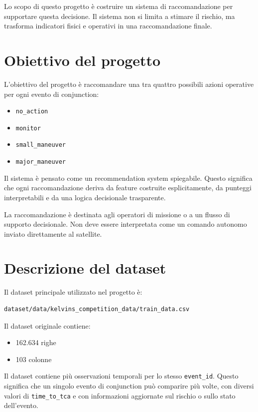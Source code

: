 \documentclass[12pt,a4paper]{article}
\begin{document}
Lo scopo di questo progetto è costruire un sistema di raccomandazione per supportare questa decisione. Il sistema non si limita a stimare il rischio, ma trasforma indicatori fisici e operativi in una raccomandazione finale.

\section{Obiettivo del progetto}

L'obiettivo del progetto è raccomandare una tra quattro possibili azioni operative per ogni evento di conjunction:

\begin{itemize}
    \item \texttt{no\_action}
    \item \texttt{monitor}
    \item \texttt{small\_maneuver}
    \item \texttt{major\_maneuver}
\end{itemize}

Il sistema è pensato come un recommendation system spiegabile. Questo significa che ogni raccomandazione deriva da feature costruite esplicitamente, da punteggi interpretabili e da una logica decisionale trasparente.

La raccomandazione è destinata agli operatori di missione o a un flusso di supporto decisionale. Non deve essere interpretata come un comando autonomo inviato direttamente al satellite.

\section{Descrizione del dataset}

Il dataset principale utilizzato nel progetto è:

\begin{verbatim}
dataset/data/kelvins_competition_data/train_data.csv
\end{verbatim}

Il dataset originale contiene:

\begin{itemize}
    \item 162.634 righe
    \item 103 colonne
\end{itemize}

Il dataset contiene più osservazioni temporali per lo stesso \texttt{event\_id}. Questo significa che un singolo evento di conjunction può comparire più volte, con diversi valori di \texttt{time\_to\_tca} e con informazioni aggiornate sul rischio o sullo stato dell'evento.
\end{document}
